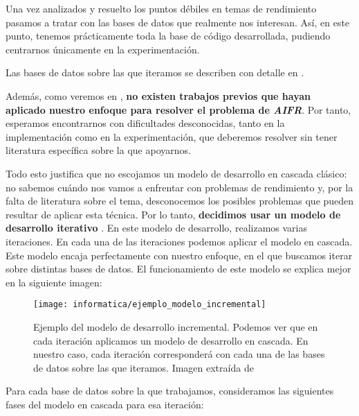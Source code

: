 Una vez analizados y resuelto los puntos débiles en temas de rendimiento pasamos a tratar con las bases de datos que realmente nos interesan. Así, en este punto, tenemos prácticamente toda la base de código desarrollada, pudiendo centrarnos únicamente en la experimentación.

Las bases de datos sobre las que iteramos se describen con detalle en .

Además, como veremos en , \textbf{no existen trabajos previos que hayan aplicado nuestro enfoque para resolver el problema de \textit{AIFR}}. Por tanto, esperamos encontrarnos con dificultades desconocidas, tanto en la implementación como en la experimentación, que deberemos resolver sin tener literatura específica sobre la que apoyarnos.

Todo esto justifica que no escojamos un modelo de desarrollo en cascada clásico: no sabemos cuándo nos vamos a enfrentar con problemas de rendimiento y, por la falta de literatura sobre el tema, desconocemos los posibles problemas que pueden resultar de aplicar esta técnica. Por lo tanto, \textbf{decidimos usar un modelo de desarrollo iterativo} \cite{informatica:libro_metodologias_desarrollo}. En este modelo de desarrollo, realizamos varias iteraciones. En cada una de las iteraciones podemos aplicar el modelo en cascada. Este modelo encaja perfectamente con nuestro enfoque, en el que buscamos iterar sobre distintas bases de datos. El funcionamiento de este modelo se explica mejor en la siguiente imagen:

\begin{figure}[H]
    \centering
    \texttt{[image: informatica/ejemplo\_modelo\_incremental]}
    \caption{Ejemplo del modelo de desarrollo incremental. Podemos ver que en cada iteración aplicamos un modelo de desarrollo en cascada. En nuestro caso, cada iteración corresponderá con cada una de las bases de datos sobre las que iteramos. Imagen extraída de \cite{informatica:libro_metodologias_desarrollo}}
\end{figure}

Para cada base de datos sobre la que trabajamos, consideramos las siguientes fases del modelo en cascada para esa iteración:

